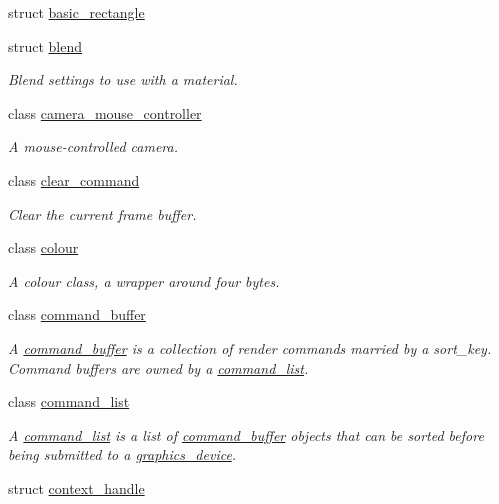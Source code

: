 \begin{DoxyCompactItemize}
struct \mbox{\hyperlink{structmoka_1_1basic__rectangle}{basic\+\_\+rectangle}}
\item 
struct \mbox{\hyperlink{structmoka_1_1blend}{blend}}
\begin{DoxyCompactList}\small\item\em Blend settings to use with a material. \end{DoxyCompactList}\item 
class \mbox{\hyperlink{classmoka_1_1camera__mouse__controller}{camera\+\_\+mouse\+\_\+controller}}
\begin{DoxyCompactList}\small\item\em A mouse-\/controlled camera. \end{DoxyCompactList}\item 
class \mbox{\hyperlink{classmoka_1_1clear__command}{clear\+\_\+command}}
\begin{DoxyCompactList}\small\item\em Clear the current frame buffer. \end{DoxyCompactList}\item 
class \mbox{\hyperlink{classmoka_1_1colour}{colour}}
\begin{DoxyCompactList}\small\item\em A colour class, a wrapper around four bytes. \end{DoxyCompactList}\item 
class \mbox{\hyperlink{classmoka_1_1command__buffer}{command\+\_\+buffer}}
\begin{DoxyCompactList}\small\item\em A \mbox{\hyperlink{classmoka_1_1command__buffer}{command\+\_\+buffer}} is a collection of render commands married by a sort\+\_\+key. Command buffers are owned by a \mbox{\hyperlink{classmoka_1_1command__list}{command\+\_\+list}}. \end{DoxyCompactList}\item 
class \mbox{\hyperlink{classmoka_1_1command__list}{command\+\_\+list}}
\begin{DoxyCompactList}\small\item\em A \mbox{\hyperlink{classmoka_1_1command__list}{command\+\_\+list}} is a list of \mbox{\hyperlink{classmoka_1_1command__buffer}{command\+\_\+buffer}} objects that can be sorted before being submitted to a \mbox{\hyperlink{classmoka_1_1graphics__device}{graphics\+\_\+device}}. \end{DoxyCompactList}\item 
struct \mbox{\hyperlink{structmoka_1_1context__handle}{context\+\_\+handle}}

\end{DoxyCompactItemize}
